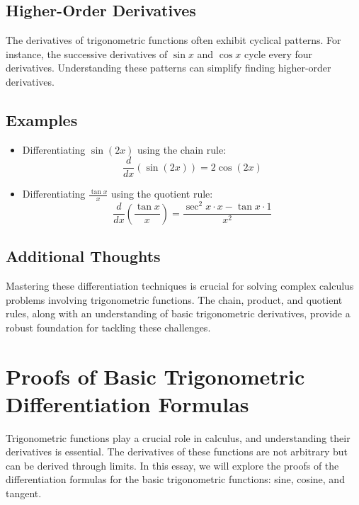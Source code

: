 \documentclass[a4paper,12pt]{book}
\newcounter{problem}
\begin{document}
\subsection*{Higher-Order Derivatives}

The derivatives of trigonometric functions often exhibit cyclical patterns. For instance, the successive derivatives of \(\sin x\) and \(\cos x\) cycle every four derivatives. Understanding these patterns can simplify finding higher-order derivatives.

\subsection*{Examples}

\begin{itemize}
    \item Differentiating \(\sin(2x)\) using the chain rule:
    \begin{equation}
    \frac{d}{dx} (\sin(2x)) = 2 \cos(2x)
    \end{equation}
    
    \item Differentiating \(\frac{\tan x}{x}\) using the quotient rule:
    \begin{equation}
    \frac{d}{dx} \left(\frac{\tan x}{x}\right) = \frac{\sec^2 x \cdot x - \tan x \cdot 1}{x^2}
    \end{equation}
\end{itemize}

\subsection*{Additional Thoughts}

Mastering these differentiation techniques is crucial for solving complex calculus problems involving trigonometric functions. The chain, product, and quotient rules, along with an understanding of basic trigonometric derivatives, provide a robust foundation for tackling these challenges.

\section*{Proofs of Basic Trigonometric Differentiation Formulas}

Trigonometric functions play a crucial role in calculus, and understanding their derivatives is essential. The derivatives of these functions are not arbitrary but can be derived through limits. In this essay, we will explore the proofs of the differentiation formulas for the basic trigonometric functions: sine, cosine, and tangent. 
\end{document}
